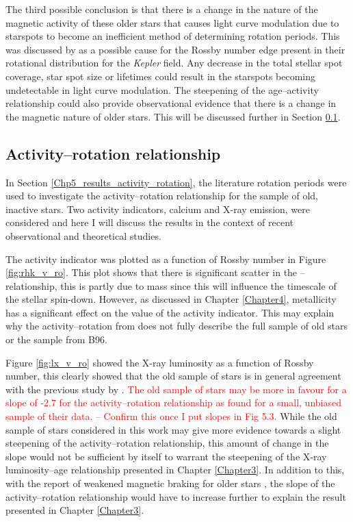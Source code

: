 The third possible conclusion is that there is a change in the nature of the magnetic activity of these older stars that causes light curve modulation due to starspots to become an inefficient method of determining rotation periods. This was discussed by \citet{van_Saders_etal_2019} as a possible cause for the Rossby number edge present in their rotational distribution for the \textit{Kepler} field. Any decrease in the total stellar spot coverage, star spot size or lifetimes could result in the starspots becoming undetectable in light curve modulation. The steepening of the age--activity relationship \citet{Booth_etal_2017} could also provide observational evidence that there is a change in the magnetic nature of older stars. This will be discussed further in Section \ref{Chp5_discuss_activity_rotation}.

\subsection{Activity--rotation relationship}
\label{Chp5_discuss_activity_rotation}
In Section \ref{Chp5_results_activity_rotation}, the literature rotation periods were used to investigate the activity--rotation relationship for the sample of old, inactive stars. Two activity indicators, calcium and X-ray emission, were considered and here I will discuss the results in the context of recent observational and theoretical studies.

The \Rprime activity indicator was plotted as a function of Rossby number in Figure \ref{fig:rhk_v_ro}. This plot shows that there is significant scatter in the \Rprime--\Ro relationship, this is partly due to mass since this will influence the timescale of the stellar spin-down. However, as discussed in Chapter \ref{Chapter4}, metallicity has a significant effect on the value of the \Rprime activity indicator. This may explain why the activity--rotation from \citet{Mamajek_Hillenbrand_2008} does not fully describe the full sample of old stars or the sample from B96.

Figure \ref{fig:lx_v_ro} showed the X-ray luminosity as a function of Rossby number, this clearly showed that the old sample of stars is in general agreement with the previous study by \citet{Wright_etal_2011}. \textcolor{red}{The old sample of stars may be more in favour for a slope of -2.7 for the activity--rotation relationship as \citet{Wright_etal_2011} found for a small, unbiased sample of their data. -- Confirm this once I put slopes in Fig 5.3.} While the old sample of stars considered in this work may give more evidence towards a slight steepening of the activity--rotation relationship, this amount of change in the slope would not be sufficient by itself to warrant the steepening of the X-ray luminosity--age relationship presented in Chapter \ref{Chapter3}. In addition to this, with the report of weakened magnetic braking for older stars \citep{van_Saders_etal_2016}, the slope of the activity--rotation relationship would have to increase further to explain the result presented in Chapter \ref{Chapter3}. 

